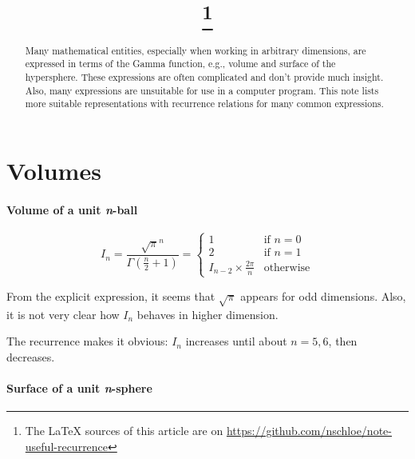 \documentclass{scrartcl}
\title{\mytitle\footnote{The LaTeX sources of this article are on \url{https://github.com/nschloe/note-useful-recurrence}}}
\author{\myauthor}
\begin{document}
\maketitle
\begin{abstract}
  Many mathematical entities, especially when working in arbitrary dimensions, are
  expressed in terms of the Gamma function, e.g., volume and surface of the hypersphere.
  These expressions are often complicated and don't provide much insight. Also, many
  expressions are unsuitable for use in a computer program. This note lists more
  suitable representations with recurrence relations for many common expressions.
\end{abstract}


\section{Volumes}

\paragraph{Volume of a unit \textit{n}-ball}

\[
  I_n
  = \frac{\sqrt{\pi}^n}{\Gamma(\frac{n}{2}+1)}
  = \begin{cases}
     1&\text{if $n = 0$}\\
     2&\text{if $n = 1$}\\
     I_{n-2} \times \frac{2\pi}{n}&\text{otherwise}
  \end{cases}
\]

From the explicit expression, it seems that $\sqrt{\pi}$ appears for odd dimensions.
Also, it is not very clear how $I_n$ behaves in higher dimension.

The recurrence makes it obvious: $I_n$ increases until about $n=5,6$, then decreases.


\paragraph{Surface of a unit \textit{n}-sphere}
\end{document}
